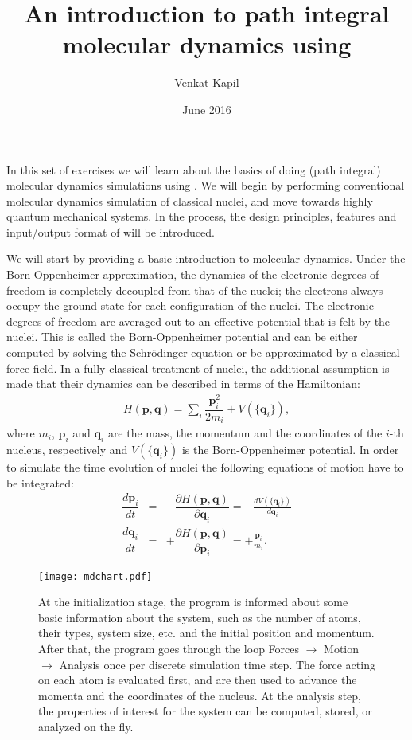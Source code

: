 \documentclass{article}
\title{An introduction to path integral \\molecular dynamics using \ipi{}}
\author{Venkat Kapil}
\date{June 2016}
\begin{document}
\maketitle

In this set of exercises we will learn about the basics of doing (path integral) molecular dynamics simulations using \ipi{}. We will begin by performing conventional molecular dynamics simulation of classical nuclei, and move towards highly quantum mechanical systems. In the process, the design principles, features and input/output format of \ipi{} will be introduced.

\begin{Exercise}[label={i-pi},title={Molecular Dynamics: a client/server approach}]

We will start by providing a basic introduction to molecular dynamics. Under the Born-Oppenheimer approximation, the dynamics of the electronic degrees of freedom is completely decoupled from that of the nuclei; the electrons always occupy the ground state for each configuration of the nuclei. The electronic degrees of freedom are averaged out to an effective potential that is felt by the nuclei. This is called the Born-Oppenheimer potential and can be either computed by solving the Schr\"odinger equation or be approximated by a classical force field. In a fully classical treatment of nuclei, the additional assumption is made that their dynamics can be described in terms of the Hamiltonian:
\begin{eqnarray}
    H(\textbf{p},\textbf{q})=\sum_i \dfrac{\textbf{p}_i^2}{2 m_i} + V(\{\textbf{q}_i\}),
\end{eqnarray}
where $m_i$, $\textbf{p}_i$ and $\textbf{q}_i$ are the mass, the momentum and the coordinates of the $i$-th nucleus, respectively and $V(\{\textbf{q}_i\})$ is the  Born-Oppenheimer potential. In order to simulate the time evolution of nuclei the following equations of motion have to be integrated:
\begin{eqnarray}
   \dfrac{d \textbf{p}_i}{d t}&=& 
   - \dfrac{\partial H(\textbf{p},\textbf{q})}{\partial \textbf{q}_i}=-\frac{d V(\{\textbf{q}_i\})}{d\textbf{q}_i} \\
   \dfrac{d \textbf{q}_i}{d t}&=& 
   + \dfrac{\partial H(\textbf{p},\textbf{q})}{\partial \textbf{p}_i} = + \frac{\textbf{p}_i}{m_i}.
\end{eqnarray}
\begin{figure}[h]
    \begin{center}
    \texttt{[image: mdchart.pdf]}
    \end{center}
    \caption{At the initialization stage, the program is informed about some basic information about the system, such as the number of atoms, their types, system size, etc. and the initial position and momentum. After that, the program goes through the loop Forces $\rightarrow$ Motion $\rightarrow$ Analysis once per discrete simulation time step. The force acting on each atom is evaluated first, and are then used to advance the momenta and the coordinates of the nucleus. At the analysis step, the properties of interest for the system can be computed, stored, or analyzed on the fly.
    \label{fig:MD_flow}}
\end{figure}


\end{Exercise}
\end{document}
